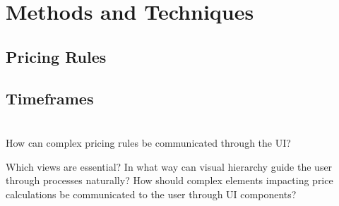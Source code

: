 %
%
\section{Methods and Techniques}

\subsection{Pricing Rules}
\subsection{Timeframes}


%
%
\section{}

%
%
\section{}

How can complex pricing rules be communicated through the UI?

Which views are essential?
In what way can visual hierarchy guide the user through processes naturally?
How should complex elements impacting price calculations be communicated to the user through UI components?

